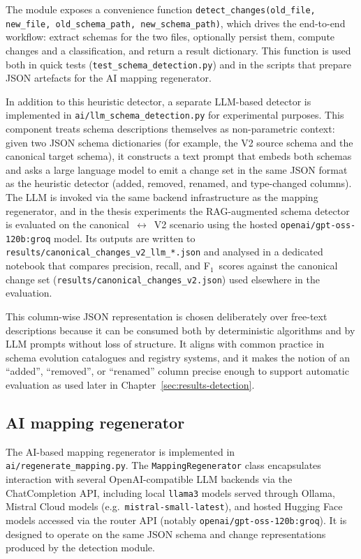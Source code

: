 The module exposes a convenience function \texttt{detect\_changes(old\_file,
new\_file, old\_schema\_path, new\_schema\_path)}, which drives the end-to-end
workflow: extract schemas for the two files, optionally persist them, compute
changes and a classification, and return a result dictionary. This function is
used both in quick tests (\texttt{test\_schema\_detection.py}) and in the
scripts that prepare JSON artefacts for the AI mapping regenerator.

In addition to this heuristic detector, a separate LLM-based detector is implemented in
\texttt{ai/llm\_schema\_detection.py} for experimental purposes. This component treats schema
descriptions themselves as non-parametric context: given two JSON schema dictionaries (for example,
the V2 source schema and the canonical target schema), it constructs a text prompt that embeds both
schemas and asks a large language model to emit a change set in the same JSON format as the
heuristic detector (added, removed, renamed, and type-changed columns). The LLM is invoked via the
same backend infrastructure as the mapping regenerator, and in the thesis experiments the
RAG-augmented schema detector is evaluated on the canonical~$\leftrightarrow$~V2 scenario using the
hosted \texttt{openai/gpt-oss-120b:groq} model. Its outputs are written to
\texttt{results/canonical\_changes\_v2\_llm\_*.json} and analysed in a dedicated notebook that
compares precision, recall, and F\(_1\)~scores against the canonical change set
(\texttt{results/canonical\_changes\_v2.json}) used elsewhere in the evaluation.

This column-wise JSON representation is chosen deliberately over free-text descriptions because it can be consumed both by deterministic algorithms and by LLM prompts without loss of structure. It aligns with common practice in schema evolution catalogues and registry systems, and it makes the notion of an “added”, “removed”, or “renamed” column precise enough to support automatic evaluation as used later in Chapter~\ref{sec:results-detection}.

\subsection{AI mapping regenerator}
\label{sec:method-ai}

The AI-based mapping regenerator is implemented in
\texttt{ai/regenerate\_mapping.py}. The \texttt{MappingRegenerator} class
encapsulates interaction with several OpenAI-compatible LLM backends via the
ChatCompletion API, including local \texttt{llama3} models served through
Ollama, Mistral Cloud models (e.g.\ \texttt{mistral-small-latest}), and hosted
Hugging Face models accessed via the router API (notably
\texttt{openai/gpt-oss-120b:groq}). It is designed to operate on the same JSON
schema and change representations produced by the detection module.

